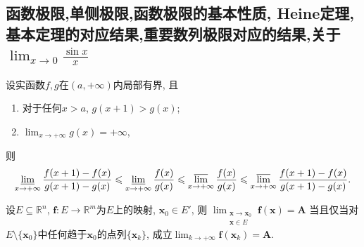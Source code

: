 \subsection{函数极限,单侧极限,函数极限的基本性质, Heine定理,基本定理的对应结果,重要数列极限对应的结果,关于\(\lim_{x\rightarrow 0}\frac{\sin x}{x}\)}
\begin{proposition}\label{C31}
    设实函数\(f,g\)在\((a,+\infty)\)内局部有界, 且
    \begin{enumerate}[label=(\roman*)]
        \item 对于任何\(x>a\), \(g(x+1)>g(x)\);
        \item \(\lim_{x\rightarrow+\infty}g(x)=+\infty\),
    \end{enumerate}则\[\varliminf_{x\rightarrow+\infty}\frac{f(x+1)-f(x)}{g(x+1)-g(x)}\leqslant\varliminf_{x\rightarrow+\infty}\frac{f(x)}{g(x)}\leqslant\varlimsup_{x\rightarrow+\infty}\frac{f(x)}{g(x)}\leqslant\varlimsup_{x\rightarrow+\infty}\frac{f(x+1)-f(x)}{g(x+1)-g(x)}.\]
\end{proposition}
\begin{theorem}[Heine定理]\label{C33}
设\(E\subseteq\mathbb{R}^n\), \(\boldsymbol{f}:E\rightarrow\mathbb{R}^m\)为\(E\)上的映射, \(\boldsymbol{x}_0\in E'\), 
则 \(\lim_{\substack{\boldsymbol{x}\rightarrow\boldsymbol{x}_0\\\boldsymbol{x}\in E}}\boldsymbol{f}(\boldsymbol{x})=\boldsymbol{A}\)
当且仅当对\(E\setminus\{\boldsymbol{x}_0\}\)中任何趋于\(\boldsymbol{x}_0\)的点列\(\{\boldsymbol{x}_k\}\), 
成立\(\lim_{k\rightarrow+\infty}\boldsymbol{f}(\boldsymbol{x}_k)=\boldsymbol{A}\).
\end{theorem}
